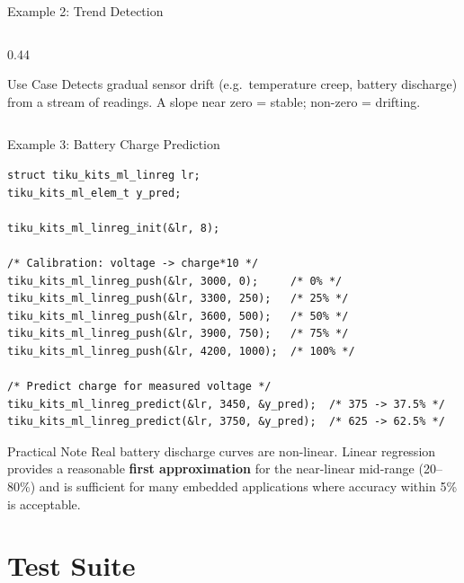 \documentclass[aspectratio=169, 10pt]{beamer}
\begin{document}
\begin{frame}[fragile]{Example 2: Trend Detection}
\begin{columns}[T]
\begin{column}{0.44\textwidth}
\begin{center}
\end{center}

\vspace{0.5em}
\begin{block}{Use Case}
Detects gradual sensor drift (e.g.\ temperature
creep, battery discharge) from a stream of readings.
A slope near zero = stable; non-zero = drifting.
\end{block}
\end{column}
\end{columns}
\end{frame}

\begin{frame}[fragile]{Example 3: Battery Charge Prediction}
\begin{lstlisting}[style=cstyle,
  title={Map battery voltage (mV) to charge level (percent $\times$ 10)}]
struct tiku_kits_ml_linreg lr;
tiku_kits_ml_elem_t y_pred;

tiku_kits_ml_linreg_init(&lr, 8);

/* Calibration: voltage -> charge*10 */
tiku_kits_ml_linreg_push(&lr, 3000, 0);     /* 0% */
tiku_kits_ml_linreg_push(&lr, 3300, 250);   /* 25% */
tiku_kits_ml_linreg_push(&lr, 3600, 500);   /* 50% */
tiku_kits_ml_linreg_push(&lr, 3900, 750);   /* 75% */
tiku_kits_ml_linreg_push(&lr, 4200, 1000);  /* 100% */

/* Predict charge for measured voltage */
tiku_kits_ml_linreg_predict(&lr, 3450, &y_pred);  /* 375 -> 37.5% */
tiku_kits_ml_linreg_predict(&lr, 3750, &y_pred);  /* 625 -> 62.5% */
\end{lstlisting}

\begin{alertblock}{Practical Note}
Real battery discharge curves are non-linear. Linear regression
provides a reasonable \textbf{first approximation} for the
near-linear mid-range (20--80\%) and is sufficient for many
embedded applications where accuracy within 5\% is acceptable.
\end{alertblock}
\end{frame}

\section{Test Suite}
\end{document}
